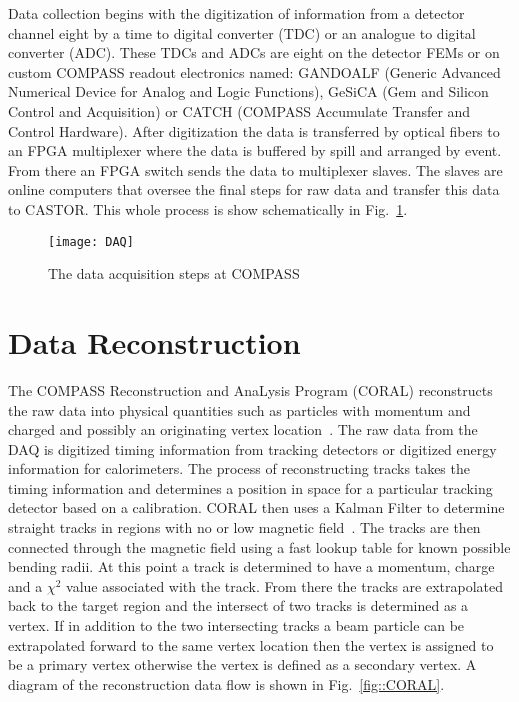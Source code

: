 Data collection begins with the digitization of information from a detector
channel eight by a time to digital converter (TDC) or an analogue to digital
converter (ADC). These TDCs and ADCs are eight on the detector FEMs or on custom
COMPASS readout electronics named: GANDOALF (Generic Advanced Numerical Device
for Analog and Logic Functions), GeSiCA (Gem and Silicon Control and
Acquisition) or CATCH (COMPASS Accumulate Transfer and Control Hardware).  After
digitization the data is transferred by optical fibers to an FPGA multiplexer
where the data is buffered by spill and arranged by event.  From there an FPGA
switch sends the data to multiplexer slaves.  The slaves are online computers
that oversee the final steps for raw data and transfer this data to CASTOR.
This whole process is show schematically in Fig.~\ref{fig::DAQ}.

\begin{figure}[h!t]
  \centering
  \texttt{[image: DAQ]}
  \caption{The data acquisition steps at COMPASS}
  \label{fig::DAQ}
\end{figure}


\section{Data Reconstruction}
The COMPASS Reconstruction and AnaLysis Program (CORAL) reconstructs the raw
data into physical quantities such as particles with momentum and charged and
possibly an originating vertex location~\cite{CORAL}.  The raw data from the DAQ
is digitized timing information from tracking detectors or digitized energy
information for calorimeters.  The process of reconstructing tracks takes the
timing information and determines a position in space for a particular tracking
detector based on a calibration.  CORAL then uses a Kalman Filter to determine
straight tracks in regions with no or low magnetic field~\cite{KalmanFilter}.
The tracks are then connected through the magnetic field using a fast lookup
table for known possible bending radii.  At this point a track is determined to
have a momentum, charge and a $\chi^2$ value associated with the track.  From
there the tracks are extrapolated back to the target region and the intersect of
two tracks is determined as a vertex.  If in addition to the two intersecting
tracks a beam particle can be extrapolated forward to the same vertex location
then the vertex is assigned to be a primary vertex otherwise the vertex is
defined as a secondary vertex.  A diagram of the reconstruction data flow is
shown in Fig.~\ref{fig::CORAL}.  \par

